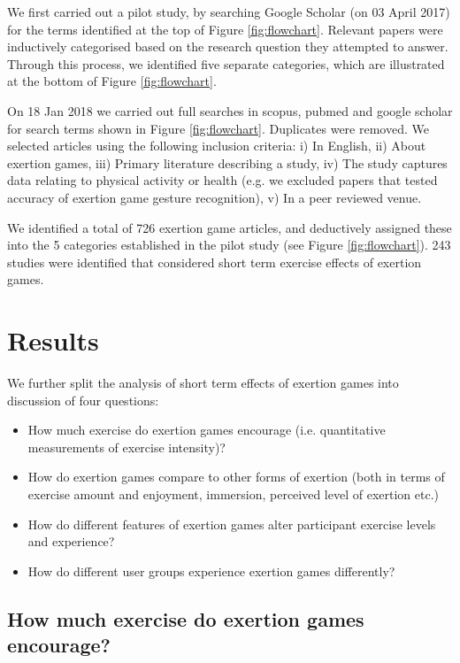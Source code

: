 We first carried out a pilot study, by searching Google Scholar (on 03 April 2017) for the terms identified at the top of Figure \ref{fig:flowchart}. Relevant papers were inductively categorised based on the research question they attempted to answer. Through this process, we identified five separate categories, which are illustrated at the bottom of Figure \ref{fig:flowchart}. 

On 18 Jan 2018 we carried out full searches in scopus, pubmed and google scholar for search terms shown in Figure \ref{fig:flowchart}.  Duplicates were removed. We selected articles using the following inclusion criteria: i) In English, ii) About exertion games, iii) Primary literature describing a study, iv) The study captures data relating to physical activity or health (e.g. we excluded papers that tested accuracy of exertion game gesture recognition), v) In a peer reviewed venue.

We identified a total of 726 exertion game articles, and deductively assigned these into the 5 categories established in the pilot study (see Figure \ref{fig:flowchart}). 243 studies were identified that considered short term exercise effects of exertion games.  

\section{Results}

We further split the analysis of short term effects of exertion games into discussion of four questions:
\begin{itemize}
    \item How much exercise do exertion games encourage (i.e. quantitative measurements of exercise intensity)?
    \item How do exertion games compare to other forms of exertion (both in terms of exercise amount and enjoyment, immersion, perceived level of exertion etc.)
    \item How do different features of exertion games alter participant exercise levels and experience?
    \item How do different user groups experience exertion games differently?
\end{itemize}



\subsection{How much exercise do exertion games encourage?}

